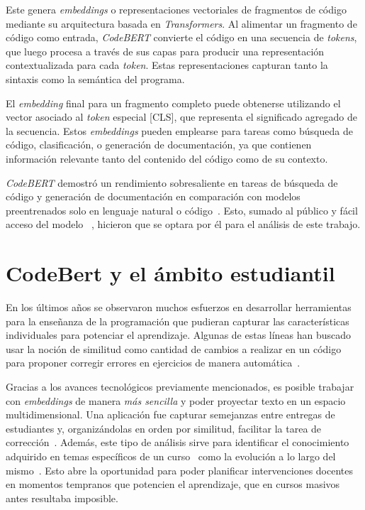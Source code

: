 \documentclass[11pt,a4paper,twoside,openany]{tesis}
\begin{document}
Este genera  \emph{embeddings} o representaciones vectoriales de fragmentos de código mediante su arquitectura basada en \emph{Transformers}. Al alimentar un fragmento de código como entrada, \emph{CodeBERT} convierte el código en una secuencia de \emph{tokens}, que luego procesa a través de sus capas para producir una representación contextualizada para cada \emph{token}. Estas representaciones capturan tanto la sintaxis como la semántica del programa.

El \emph{embedding} final para un fragmento completo puede obtenerse utilizando el vector asociado al \emph{token} especial [CLS], que representa el significado agregado de la secuencia. Estos \emph{embeddings} pueden emplearse para tareas como búsqueda de código, clasificación, o generación de documentación, ya que contienen información relevante tanto del contenido del código como de su contexto.

\emph{CodeBERT} demostró un rendimiento sobresaliente en tareas de búsqueda de código y generación de documentación en comparación con modelos preentrenados solo en lenguaje natural o código~\cite{codeBert}. Esto, sumado al público y fácil acceso del modelo~\cite{codeBert-repo} , hicieron que se optara por él para el análisis de este trabajo.

\section{CodeBert y el ámbito estudiantil}

En los últimos años se observaron muchos esfuerzos en desarrollar herramientas para la enseñanza de la programación que pudieran capturar las características individuales para potenciar el aprendizaje. Algunas de estas líneas han buscado usar la noción de similitud como cantidad de cambios a realizar en un código para proponer corregir errores en ejercicios de manera automática~\cite{gulwani2018automated}.

Gracias a los avances tecnológicos previamente mencionados, es posible trabajar con \emph{embeddings} de manera \emph{más sencilla} y poder proyectar texto en un espacio multidimensional. Una aplicación fue capturar semejanzas entre entregas de estudiantes y, organizándolas en orden por similitud, facilitar la tarea de corrección~\cite{simgrade}. Además, este tipo de análisis sirve para identificar el conocimiento adquirido en temas específicos de un curso~\cite{brigante2020evaluation} como la evolución a lo largo del mismo~\cite{wu2018zeroshotlearningcode}. Esto abre la oportunidad para poder planificar intervenciones docentes en momentos tempranos que potencien el aprendizaje, que en cursos masivos antes resultaba imposible. 
\end{document}
